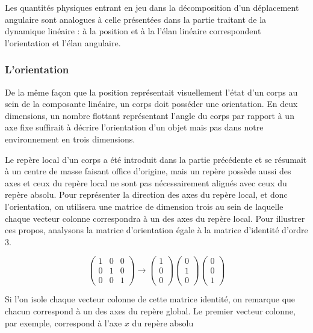 Les quantités physiques entrant en jeu dans la décomposition d'un déplacement angulaire sont analogues à celle présentées dans la partie traitant de la dynamique linéaire : à la position et à la l'élan linéaire correspondent l'orientation et l'élan angulaire.

\subsubsection{L'orientation}

De la même façon que la position représentait visuellement l'état d'un corps au sein de la composante linéaire, un corps doit posséder une orientation. En deux dimensions, un nombre flottant représentant l'angle du corps par rapport à un axe fixe suffirait à décrire l'orientation d'un objet mais pas dans notre environnement en trois dimensions.

Le repère local d'un corps a été introduit dans la partie précédente et se résumait à un centre de masse faisant office d'origine, mais un repère possède aussi des axes et ceux du repère local ne sont pas nécessairement alignés avec ceux du repère absolu. Pour représenter la direction des axes du repère local, et donc l'orientation, on utilisera une matrice de dimension trois au sein de laquelle chaque vecteur colonne correspondra à un des axes du repère local. Pour illustrer ces propos, analysons la matrice d'orientation égale à la matrice d'identité d'ordre 3.

\[
\begin{pmatrix}
  1 & 0 & 0 \\
  0 & 1 & 0 \\
  0 & 0 & 1
\end{pmatrix}
\rightarrow
\begin{pmatrix}
  1 \\
  0 \\
  0 
\end{pmatrix}
\begin{pmatrix}
  0 \\
  1 \\
  0 
\end{pmatrix}
\begin{pmatrix}
  0 \\
  0 \\
  1 
\end{pmatrix}
\]

Si l'on isole chaque vecteur colonne de cette matrice identité, on remarque que chacun correspond à un des axes du repère global. Le premier vecteur colonne, par exemple, correspond à l'axe $x$ du repère absolu


